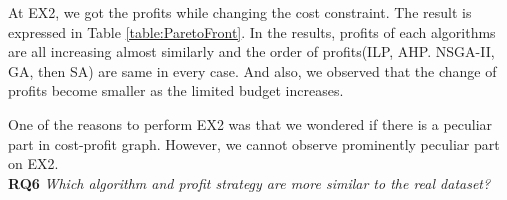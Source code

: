 At EX2, we got the profits while changing the cost constraint. The result is expressed in Table \ref{table:ParetoFront}. In the results, profits of each algorithms are all increasing almost similarly and the order of profits(ILP, AHP. NSGA-II, GA, then SA) are same in every case. And also, we observed that the change of profits become smaller as the limited budget increases.

One of the reasons to perform EX2 was that we wondered if there is a peculiar part in cost-profit graph. However, we cannot observe prominently peculiar part on EX2.\\


\textbf{RQ6} \textit{Which algorithm and profit strategy are more similar to the real dataset?}





